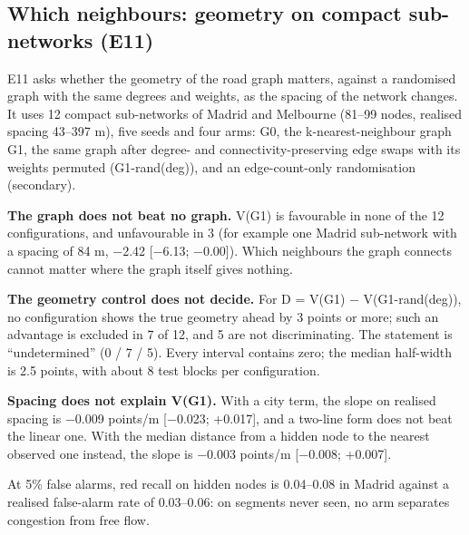 \subsection{Which neighbours: geometry on compact sub-networks (E11)}
E11 asks whether the geometry of the road graph matters, against a randomised graph with the same degrees and weights, as the spacing of the network changes. It uses 12 compact sub-networks of Madrid and Melbourne (81–99 nodes, realised spacing 43–397 m), five seeds and four arms: G0, the k-nearest-neighbour graph G1, the same graph after degree- and connectivity-preserving edge swaps with its weights permuted (G1-rand(deg)), and an edge-count-only randomisation (secondary).

\textbf{The graph does not beat no graph.} V(G1) is favourable in none of the 12 configurations, and unfavourable in 3 (for example one Madrid sub-network with a spacing of 84 m, −2.42 [−6.13; −0.00]). Which neighbours the graph connects cannot matter where the graph itself gives nothing.

\textbf{The geometry control does not decide.} For D = V(G1) − V(G1-rand(deg)), no configuration shows the true geometry ahead by 3 points or more; such an advantage is excluded in 7 of 12, and 5 are not discriminating. The statement is ``undetermined'' (0 / 7 / 5). Every interval contains zero; the median half-width is 2.5 points, with about 8 test blocks per configuration.

\textbf{Spacing does not explain V(G1).} With a city term, the slope on realised spacing is −0.009 points/m [−0.023; +0.017], and a two-line form does not beat the linear one. With the median distance from a hidden node to the nearest observed one instead, the slope is −0.003 points/m [−0.008; +0.007].

At 5\% false alarms, red recall on hidden nodes is 0.04–0.08 in Madrid against a realised false-alarm rate of 0.03–0.06: on segments never seen, no arm separates congestion from free flow.

